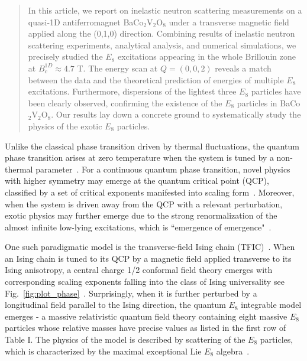 \documentclass[aps,prl,twocolumn,superscriptaddress,groupedaddress]{revtex4}
\begin{document}
\begin{abstract}
In this article, we report on inelastic neutron scattering measurements on a quasi-1D antiferromagnet BaCo$_2$V$_2$O$_8$ under a transverse magnetic field applied along the (0,1,0) direction. Combining results of inelastic neutron scattering experiments, analytical analysis, and numerical simulations, we precisely studied the $E_8$ excitations appearing in the whole Brillouin zone at $B_c^{1D}\approx 4.7$ T. The energy scan at $Q=(0,0,2)$ reveals a match between the data and the theoretical prediction of energies of multiple $E_8$ excitations. Furthermore, dispersions of the lightest three $E_8$ particles have been clearly observed, confirming the existence of the $E_8$ particles in BaCo$_2$V$_2$O$_8$. Our results lay down a concrete ground to systematically study the physics of the exotic $E_8$ particles.
\end{abstract}

\maketitle


Unlike the classical phase transition driven by thermal fluctuations, the quantum phase transition arises at zero temperature when the system is tuned by a non-thermal parameter~\cite{sachdev_2011}. For a continuous quantum phase transition, novel physics with higher symmetry may emerge at the quantum critical point (QCP), classified by a set of critical exponents manifested into scaling form~\cite{sachdev_2011}. Moreover, when the system is driven away from the QCP with a relevant perturbation, exotic physics may further emerge due to the strong renormalization of the almost infinite low-lying excitations,
which is ``emergence of emergence"~\cite{Zamolodchikov:1989fp,dorey1996,dorey1990}.


One such paradigmatic model is the transverse-field Ising
chain (TFIC)~\cite{sachdev_2011,Pfeuty}. When an Ising chain is tuned to its QCP by a magnetic field applied transverse to its Ising anisotropy, a central
charge 1/2 conformal field theory emerges with corresponding scaling exponents
falling into the class of Ising universality see Fig.~\ref{fig:plot_phase}~\cite{Pfeuty,Daniel}. Surprisingly,
when it is further perturbed by a longitudinal field parallel to the Ising direction,
the quantum $E_8$ integrable model emerges - a massive relativistic quantum field theory containing eight massive $E_8$ particles whose relative masses have precise values as listed in the first row of Table I. The physics of the model is described by scattering of the $E_8$ particles, which is characterized by the maximal exceptional Lie $E_8$ algebra~\cite{Zamolodchikov:1989fp,DELFINO1995724,Zou_2021,PhysRevB.101.220411,xiao_2021}.
\end{document}
